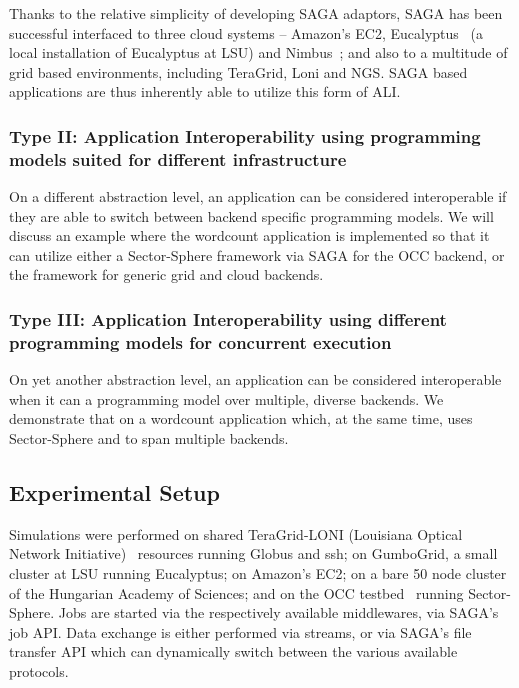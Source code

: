 \documentclass[3p,twocolumn]{elsarticle}
\begin{document}
Thanks to the relative simplicity of developing SAGA adaptors, SAGA
has been successful interfaced to three cloud systems -- Amazon's
EC2, Eucalyptus~\cite{eucalyptus} (a local installation of Eucalyptus
at LSU) and Nimbus~\cite{nimbus};  and also to a multitude of grid
based environments, including TeraGrid, Loni and NGS.  SAGA based
applications are thus inherently able to utilize this form of ALI.


\subsubsection{Type II: Application Interoperability using programming
  models suited for different infrastructure}
%
%
On a different abstraction level, an application can be considered
interoperable if they are able to switch between backend specific
programming models.  We will discuss an example where the wordcount
application is implemented so that it can utilize either a
Sector-Sphere framework via SAGA for the OCC backend, or the \smr
framework for generic grid and cloud backends.


\subsubsection{Type III: Application Interoperability using different
  programming models for concurrent execution}
%
%
On yet another abstraction level, an application can be considered
interoperable when it can  a programming model over
multiple, diverse backends.  We demonstrate that on a wordcount
application which, at the same time, uses Sector-Sphere \MR and \smr
to span multiple backends.
            

\subsection{Experimental Setup}

Simulations were performed on shared TeraGrid-LONI (Louisiana Optical
Network Initiative)~\cite{loni-url} resources running Globus and ssh;
on GumboGrid, a small cluster at LSU running Eucalyptus; on Amazon's
EC2; on a bare 50 node cluster of the Hungarian Academy of Sciences;
and on the OCC testbed~\cite{occ_testbed} running Sector-Sphere.  Jobs
are started via the respectively available middlewares, via SAGA's job
API.  Data exchange is either performed via streams, or  via SAGA's
file transfer API which can dynamically switch between the various
available protocols.
\end{document}
